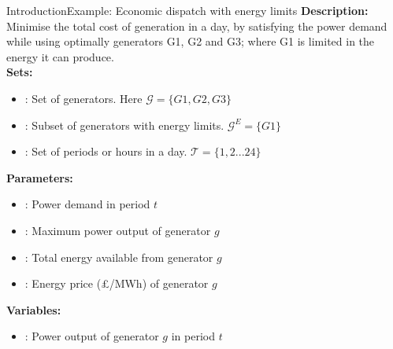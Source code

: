 \documentclass[handout]{beamer}
\newcommand{\overbar}[1]{\mkern 1.5mu\overline{\mkern-1.5mu#1\mkern-1.5mu}\mkern 1.5mu}
\newcommand\Fontvi{\fontsize{9.5}{10.7}\selectfont}
\begin{document}

\begin{frame}[t]{Introduction}{Example: Economic dispatch with energy limits}
\Fontvi
\textbf{Description:}\\
Minimise the total cost of generation in a day, by satisfying the power demand while using optimally generators G1, G2 and G3; where G1 is limited in the energy it can produce.\\[6pt]

\textbf{Sets:}
\begin{itemize}
    \item {: Set of generators. Here $\mathcal{G} = \{G1,G2,G3\}$}
    \item {: Subset of generators with energy limits. $\mathcal{G}^E = \{G1\}$}
    \item {: Set of periods or hours in a day. $\mathcal{T} = \{1,2...24\}$}
\end{itemize}

\textbf{Parameters:}
\begin{itemize}
    \item {: Power demand in period $t$}
    \item {\makebox[0.75cm]{$\overbar{P}_g$\hfill}: Maximum power output of generator $g$}
    \item {: Total energy available from generator $g$}
    \item {: Energy price (£/MWh) of generator $g$}
\end{itemize}

\textbf{Variables:}
\begin{itemize}
    \item {: Power output of generator $g$ in period $t$}
\end{itemize}
\end{frame}

\end{document}
